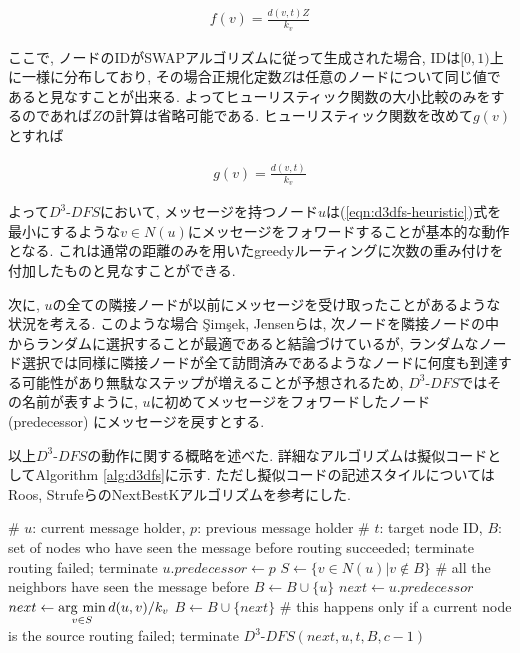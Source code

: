\documentclass[dvipdfmx]{ampbt}
\newcommand{\argmin}{\mathop{\rm arg~min}\limits}
\begin{document}
\begin{eqnarray*}
f(v) = \frac{d(v,t)Z}{k_v} \label{eqn:d3dfs-heuristic-pre}
\end{eqnarray*}

ここで, ノードのIDがSWAPアルゴリズムに従って生成された場合, IDは$[0,1)$上に一様に分布しており, その場合正規化定数$Z$は任意のノードについて同じ値であると見なすことが出来る. よってヒューリスティック関数の大小比較のみをするのであれば$Z$の計算は省略可能である. ヒューリスティック関数を改めて$g(v)$とすれば

\begin{eqnarray}
g(v) = \frac{d(v,t)}{k_v} \label{eqn:d3dfs-heuristic}
\end{eqnarray}

よって$D^3$-$DFS$において, メッセージを持つノード$u$は(\ref{eqn:d3dfs-heuristic})式を最小にするような$v \in N(u)$にメッセージをフォワードすることが基本的な動作となる. これは通常の距離のみを用いたgreedyルーティングに次数の重み付けを付加したものと見なすことができる.

次に, $u$の全ての隣接ノードが以前にメッセージを受け取ったことがあるような状況を考える. このような場合 {\c{S}}im{\c{s}}ek, Jensenらは, 次ノードを隣接ノードの中からランダムに選択することが最適であると結論づけているが, ランダムなノード選択では同様に隣接ノードが全て訪問済みであるようなノードに何度も到達する可能性があり無駄なステップが増えることが予想されるため, $D^3$-$DFS$ではその名前が表すように, $u$に初めてメッセージをフォワードしたノード (predecessor) にメッセージを戻すとする.

以上$D^3$-$DFS$の動作に関する概略を述べた. 詳細なアルゴリズムは擬似コードとしてAlgorithm \ref{alg:d3dfs}に示す. ただし擬似コードの記述スタイルについてはRoos, StrufeらのNextBestKアルゴリズム\cite{roos2012provable}を参考にした.
\clearpage
   \begin{algorithm}[htbp]
    \caption{$D^3$-$DFS(\textrm{Node } u,\textrm{ Node } p, \textrm{ ID } t,\textrm{ Set }B, \textrm{ TTL }c$)}\label{alg:d3dfs}
    \begin{algorithmic}[1]
     \State \# $u$: current message holder, $p$: previous message holder
     \State \# $t$: target node ID, $B$: set of nodes who have seen the message before
     \State \textrm{routing succeeded; terminate}
     \EndIf
     \State \textrm{routing failed; terminate}
     \EndIf
     \State $u.predecessor \gets p$
     \EndIf
     \State $S \gets \{v \in N(u) |  v \notin B \}$
      \# all the neighbors have seen the message before
     \State $B \gets B \cup \{u\}$
     \State $next \gets u.predecessor$
     \Else
     \State $next \gets \argmin_{v \in S} d(u, v)/k_v$
     \State $B \gets B \cup \{ next\}$
     \EndIf
      \# this happens only if a current node is the source
     \State \textrm{routing failed; terminate}
     \Else
     \State $D^3$-$DFS(next, u, t, B, c-1)$
     \EndIf
    \end{algorithmic}
   \end{algorithm}
\end{document}
